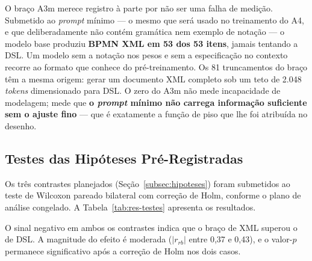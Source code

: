 O braço A3m merece registro à parte por não ser uma falha de medição. Submetido ao \textit{prompt} mínimo — o mesmo que será usado no treinamento do A4, e que deliberadamente não contém gramática nem exemplo de notação — o modelo base produziu \textbf{BPMN XML em 53 dos 53 itens}, jamais tentando a DSL. Um modelo sem a notação nos pesos e sem a especificação no contexto recorre ao formato que conhece do pré-treinamento. Os 81 truncamentos do braço têm a mesma origem: gerar um documento XML completo sob um teto de 2.048 \textit{tokens} dimensionado para DSL. O zero do A3m não mede incapacidade de modelagem; mede que \textbf{o \textit{prompt} mínimo não carrega informação suficiente sem o ajuste fino} — que é exatamente a função de piso que lhe foi atribuída no desenho.

\subsection{Testes das Hipóteses Pré-Registradas}
\label{subsec:res-hipoteses}

Os três contrastes planejados (Seção~\ref{subsec:hipoteses}) foram submetidos ao teste de Wilcoxon pareado bilateral com correção de Holm, conforme o plano de análise congelado. A Tabela~\ref{tab:res-testes} apresenta os resultados.

\begin{table}[h!]
\end{table}

O sinal negativo em ambos os contrastes indica que o braço de XML superou o de DSL. A magnitude do efeito é moderada ($|r_{rb}|$ entre 0,37 e 0,43), e o valor-$p$ permanece significativo após a correção de Holm nos dois casos.

